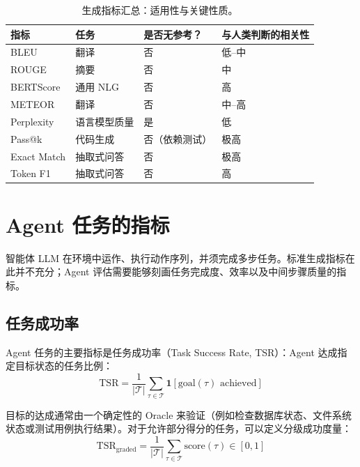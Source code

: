 \begin{table}[ht!]
\centering\small
\caption{生成指标汇总：适用性与关键性质。}
\begin{tabular}{@{}l l l l@{}}
\toprule
\textbf{指标} & \textbf{任务} & \textbf{是否无参考？} & \textbf{与人类判断的相关性} \\
\midrule
BLEU & 翻译 & 否 & 低--中 \\
ROUGE & 摘要 & 否 & 中 \\
BERTScore & 通用 NLG & 否 & 高 \\
METEOR & 翻译 & 否 & 中--高 \\
Perplexity & 语言模型质量 & 是 & 低 \\
Pass@k & 代码生成 & 否（依赖测试） & 极高 \\
Exact Match & 抽取式问答 & 否 & 极高 \\
Token F1 & 抽取式问答 & 否 & 高 \\
\bottomrule
\end{tabular}
\end{table}

\section{Agent 任务的指标}
\label{subsec:agentic-metrics}

智能体 LLM 在环境中运作、执行动作序列，并须完成多步任务。标准生成指标在此并不充分；Agent 评估需要能够刻画任务完成度、效率以及中间步骤质量的指标。

\subsection{任务成功率}
\label{task-success-rate}

Agent 任务的主要指标是任务成功率（Task Success Rate, TSR）：Agent 达成指定目标状态的任务比例：
\begin{equation}
    \text{TSR} = \frac{1}{|\mathcal{T}|} \sum_{\tau \in \mathcal{T}} \mathbf{1}[\text{goal}(\tau) \text{ achieved}]
\end{equation}

目标的达成通常由一个确定性的 Oracle 来验证（例如检查数据库状态、文件系统状态或测试用例执行结果）。对于允许部分得分的任务，可以定义分级成功度量：
\begin{equation}
    \text{TSR}_{\text{graded}} = \frac{1}{|\mathcal{T}|} \sum_{\tau \in \mathcal{T}} \text{score}(\tau) \in [0, 1]
\end{equation}

